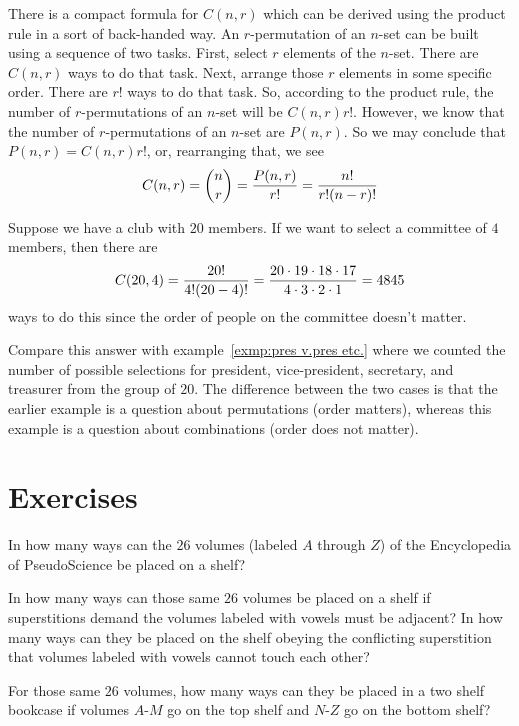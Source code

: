 There is a compact formula for $C(n,r)$ which can be derived using the
product rule in a sort of back-handed way. An $r$-permutation of an
$n$-set can be built using a sequence of two tasks. First, select
$r$ elements of the $n$-set. There are $C(n,r)$ ways to do that task. Next, 
arrange those $r$ elements in some specific order. There are $r!$ ways
to do that task. So, according to the product rule, the number
of $r$-permutations of an $n$-set will be $C(n,r)r!$. However, we
know that the number of $r$-permutations of an $n$-set are $P(n,r)$.
So we may conclude that $P(n,r) = C(n,r)r!$, or, rearranging that, we see
\[
C(n,r) = {n\choose r}= {{P(n,r)}\over{r!}} = {{n!}\over{{r!(n-r)!}}}
\]

\begin{exmp}
Suppose we have a club with $20$ members. 
If we want to select a committee
of $4$ members, then there are 
\[C(20,4)= {{20!}\over{4!(20-4)!}}
= {{20\cdot19\cdot18\cdot17}\over{4\cdot3\cdot2\cdot1}}= 4845
\]
ways to do this since the order 
of people on the committee
doesn't matter.  
\end{exmp}

Compare this answer with example~\ref{exmp:pres v.pres etc.}  where we counted the number
of possible selections for president, vice-president, secretary, and treasurer
from the group of $20$. 
The difference between the two
cases is that the earlier example is a question about permutations 
(order matters), whereas this example is
a question about combinations (order does not matter). 


\clearpage
\section{Exercises}

\begin{exer}
In how many ways can the $26$ volumes (labeled $A$ through $Z$) 
of the Encyclopedia of PseudoScience be placed on a shelf?
\end{exer}

\begin{exer}
In how many ways can those same $26$ volumes be placed on a shelf
 if superstitions demand the volumes labeled with vowels must be adjacent?
 In how many ways can they be placed on the shelf obeying the conflicting superstition
 that volumes labeled with vowels cannot touch each other?
\end{exer}

\begin{exer}
For those same $26$ volumes, how many ways can they be placed
in a two shelf bookcase if volumes $A$-$M$ go on the top shelf and $N$-$Z$
go on the bottom shelf?
\end{exer}

